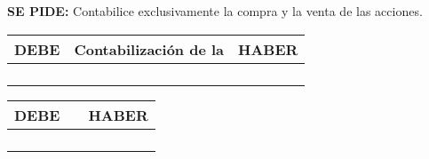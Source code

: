 \textbf{SE PIDE:} Contabilice exclusivamente la compra y la venta de las acciones.


\begin{table}[H]
    \centering
    \begin{tabular}{|p{3cm}|p{6cm}|p{3cm}|}
    \hline
    \textbf{DEBE} & \textbf{Contabilización de la } & \textbf{HABER} \\
    \hline
    &  & \\
    \hline
    &  & \\
    \hline
    &  & \\
    \hline
    &  & \\
    \hline
    \end{tabular}
\end{table}

\begin{table}[H]
    \centering
    \begin{tabular}{|p{3cm}|p{6cm}|p{3cm}|}
    \hline
    \textbf{DEBE} & \textbf{} & \textbf{HABER} \\
    \hline
    &  & \\
    \hline
    &  & \\
    \hline
    &  & \\
    \hline
    &  & \\
    \hline
    \end{tabular}
\end{table}


